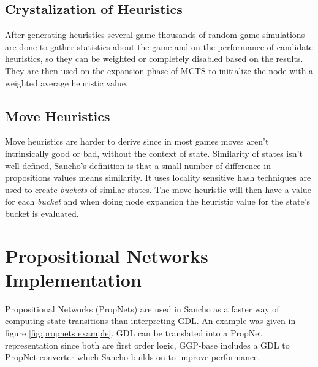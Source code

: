\subsection{Crystalization of Heuristics}
After generating heuristics several game thousands of random game simulations are done to gather statistics about the game and on the performance of candidate heuristics, so they can be weighted or completely disabled based on the results. They are then used  on the expansion phase of MCTS to initialize the node with a weighted average heuristic value.


\subsection{Move Heuristics}
Move heuristics are harder to derive since in most games moves aren't intrinsically good or bad, without the context of state. 
Similarity of states isn't well defined, Sancho's definition is that a small number of difference in propositions values means similarity. 
It uses locality sensitive hash techniques are used to create \textit{buckets} of similar states.
The move heuristic will then have a value for each \textit{bucket} and when doing node expansion the heuristic value for the state's bucket is evaluated.


\section{Propositional Networks Implementation}

Propositional Networks (PropNets) are used in Sancho as a faster way of computing state transitions than interpreting GDL. An example was given in  figure \ref{fig:propnets example}.
GDL can be translated into a PropNet representation since both are first order logic, GGP-base includes a GDL to PropNet converter which Sancho builds on to improve performance.


